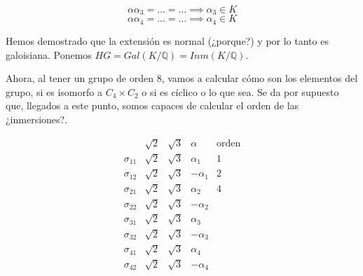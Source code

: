\begin{problem}[5]
$$αα_3 = ... = ... \implies α_3 ∈K$$
$$αα_4 = ... = ... \implies α_4 ∈K$$

Hemos demostrado que la extensión es normal (¿porque?) y por lo tanto es galoisiana. Ponemos $HG = Gal(K/ℚ) = Inm(K/ℚ)$.


Ahora, al tener un grupo de orden 8, vamos a calcular cómo son los elementos del grupo, si es isomorfo a $C_4×C_2$ o si es cíclico o lo que sea. Se da por supuesto que, llegados a este punto, somos capaces de calcular el orden de las ¿inmersiones?.

$$\begin{array}{c|c|c|c}
&\sqrt{2}&\sqrt{3} & α & \text{orden}\\\hline
σ_{11} & \sqrt{2} & \sqrt{3} & α_1& 1 \\
σ_{12} & \sqrt{2} & \sqrt{3} & -α_1& 2 \\\hline

σ_{21} & \sqrt{2} & \sqrt{3} &  α_2& 4\\
σ_{22} & \sqrt{2} & \sqrt{3} & -α_2& \\\hline

σ_{31} & \sqrt{2} & \sqrt{3} & α_3& \\
σ_{32} & \sqrt{2} & \sqrt{3} & -α_3& \\\hline

σ_{41} & \sqrt{2} & \sqrt{3} & α_4& \\
σ_{42} & \sqrt{2} & \sqrt{3} & -α_4& \\
\end{array}
$$



\end{problem}
